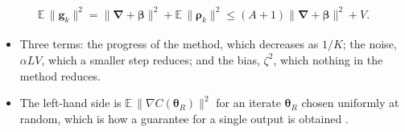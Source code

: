 \documentclass[handoutsbeamer.tex]{subfiles}
\begin{document}
\begin{frame}
{\begin{gather*}
    \mathbb E\,\|\boldsymbol g_k\|^2 = \|\boldsymbol\nabla+\boldsymbol\beta\|^2+\mathbb E\,\|\boldsymbol\rho_k\|^2\le(A+1)\|\boldsymbol\nabla+\boldsymbol\beta\|^2+V.
\end{gather*}}
\begin{itemize}\setlength\itemsep{0.15em}
    \item Three terms: the progress of the method, which decreases as $1/K$; the noise, $\alpha LV$, which a smaller step reduces; and the bias, $\zeta^2$, which nothing in the method reduces.
    \item The left-hand side is $\mathbb E\,\|\nabla C(\boldsymbol\theta_R)\|^2$ for an iterate $\boldsymbol\theta_R$ chosen uniformly at random, which is how a guarantee for a single output is obtained \citep{ghadimi2013stochastic}.
\end{itemize}
\end{frame}
\end{document}
